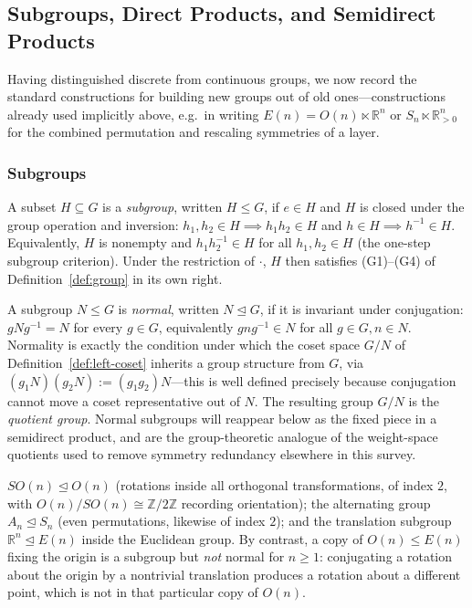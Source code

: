 \documentclass[mathematics,review,submit,moreauthors]{Definitions/mdpi}
\begin{document}

\subsection{Subgroups, Direct Products, and Semidirect Products}
\label{subsec:subgroups-products}

Having distinguished discrete from continuous groups, we now record the
standard constructions for building new groups out of old ones---constructions
already used implicitly above, e.g.\ in writing $E(n) = O(n) \ltimes
\mathbb{R}^n$ or $S_n \ltimes \mathbb{R}_{>0}^n$ for the combined permutation
and rescaling symmetries of a layer.

\subsubsection{Subgroups}
\label{subsubsec:subgroups}

\begin{Definition}
\label{def:subgroup}
A subset $H \subseteq G$ is a \emph{subgroup}, written $H \leq G$, if
$e \in H$ and $H$ is closed under the group operation and inversion:
$h_1, h_2 \in H \implies h_1 h_2 \in H$ and $h \in H \implies h^{-1} \in H$.
Equivalently, $H$ is nonempty and $h_1 h_2^{-1} \in H$ for all
$h_1, h_2 \in H$ (the one-step subgroup criterion). Under the restriction of
$\cdot$, $H$ then satisfies (G1)--(G4) of Definition~\ref{def:group} in its
own right.
\end{Definition}

A subgroup $N \leq G$ is \emph{normal}, written $N \trianglelefteq G$, if it
is invariant under conjugation: $g N g^{-1} = N$ for every $g \in G$,
equivalently $g n g^{-1} \in N$ for all $g \in G, n \in N$. Normality is
exactly the condition under which the coset space $G/N$ of
Definition~\ref{def:left-coset} inherits a group structure from $G$, via
$(g_1 N)(g_2 N) := (g_1 g_2) N$---this is well defined precisely because
conjugation cannot move a coset representative out of $N$. The resulting
group $G/N$ is the \emph{quotient group}. Normal subgroups will reappear
below as the fixed piece in a semidirect product, and are the group-theoretic
analogue of the weight-space quotients used to remove symmetry redundancy
elsewhere in this survey.

\begin{Example}
\label{ex:subgroups}
$SO(n) \trianglelefteq O(n)$ (rotations inside all orthogonal
transformations, of index $2$, with $O(n)/SO(n) \cong \mathbb{Z}/2\mathbb{Z}$
recording orientation); the alternating group
$A_n \trianglelefteq S_n$ (even permutations, likewise of index $2$); and the
translation subgroup $\mathbb{R}^n \trianglelefteq E(n)$ inside the Euclidean
group. By contrast, a copy of $O(n) \leq E(n)$ fixing the origin is a
subgroup but \emph{not} normal for $n \geq 1$: conjugating a rotation about
the origin by a nontrivial translation produces a rotation about a different
point, which is not in that particular copy of $O(n)$.
\end{Example}
\end{document}
